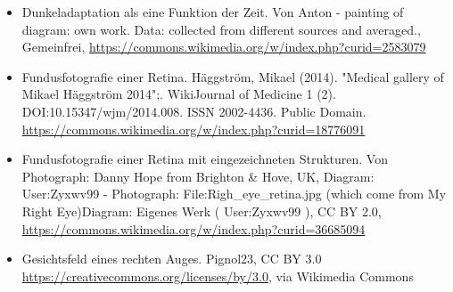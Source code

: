 \documentclass{beamer}
\begin{document}
\begin{frame}
\begin{tiny}
\begin{itemize}
\item
Dunkeladaptation als eine Funktion der Zeit. Von Anton - painting of diagram: own work. Data: collected from different sources and averaged., Gemeinfrei, \url{https://commons.wikimedia.org/w/index.php?curid=2583079}

\item
Fundusfotografie einer Retina. Häggström, Mikael (2014). "Medical gallery of Mikael Häggström 2014";. WikiJournal of Medicine 1 (2). DOI:10.15347/wjm/2014.008. ISSN 2002-4436. Public Domain. \url{https://commons.wikimedia.org/w/index.php?curid=18776091}
   
   \item
Fundusfotografie einer Retina mit eingezeichneten Strukturen. Von Photograph: Danny Hope from Brighton \& Hove, UK, Diagram: User:Zyxwv99 - Photograph: File:Righ\_eye\_retina.jpg (which come from My Right Eye)Diagram: Eigenes Werk ( User:Zyxwv99 ), CC BY 2.0,\url{ https://commons.wikimedia.org/w/index.php?curid=36685094}
  
  
 \item
 
 Gesichtsfeld eines rechten Auges. Pignol23, CC BY 3.0 \url{https://creativecommons.org/licenses/by/3.0}, via Wikimedia Commons
 \end{itemize}
\end{tiny}
\end{frame}
\end{document}
